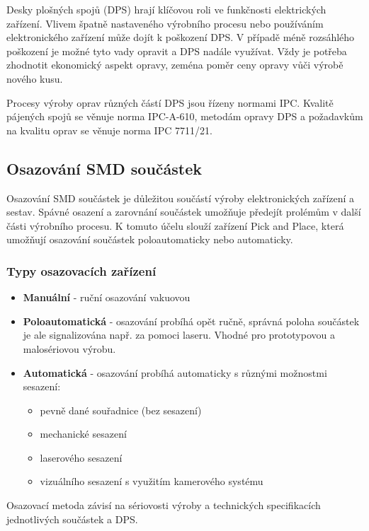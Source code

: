 Desky plošných spojů (DPS) hrají klíčovou roli ve funkčnosti elektrických zařízení. Vlivem špatně nastaveného výrobního procesu nebo používáním elektronického zařízení může dojít k poškození DPS. V případě méně rozsáhlého poškození je možné tyto vady opravit a DPS nadále využívat. Vždy je potřeba zhodnotit ekonomický aspekt opravy, zeména poměr ceny opravy vůči výrobě nového kusu. 

Procesy výroby oprav různých částí DPS jsou řízeny normami IPC. Kvalitě pájených spojů se věnuje norma IPC-A-610, metodám opravy DPS a požadavkům na kvalitu oprav se věnuje norma IPC 7711/21.


\subsection{Osazování SMD součástek}

Osazování SMD součástek je důležitou součástí výroby elektronických zařízení a sestav. Spávné osazení a zarovnání součástek umožňuje předejít prolémům v další části výrobního procesu. K tomuto účelu slouží zařízení Pick and Place, která umožňují osazování součástek poloautomaticky nebo automaticky.

\subsubsection{Typy osazovacích zařízení}

\begin{itemize}
    \item \textbf{Manuální} - ruční osazování vakuovou
    \item \textbf{Poloautomatická} - osazování probíhá opět ručně, správná poloha součástek je ale signalizována např. za pomoci laseru. Vhodné pro prototypovou a malosériovou výrobu.
    \item \textbf{Automatická} - osazování probíhá automaticky s různými možnostmi sesazení: 
    \begin{itemize}
        \item pevně dané souřadnice (bez sesazení)
        \item mechanické sesazení
        \item laserového sesazení 
        \item vizuálního sesazení s využitím kamerového systému
    \end{itemize}
\end{itemize}

Osazovací metoda závisí na sériovosti výroby a technických specifikacích jednotlivých součástek a DPS.


